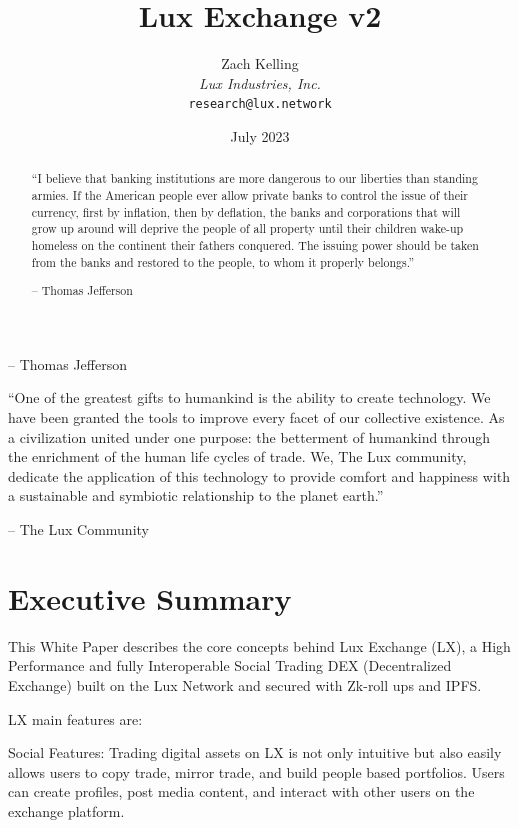 \documentclass[11pt]{article}
\title{Lux Exchange v2}
\author{Zach Kelling\\\textit{Lux Industries, Inc.}\\\texttt{research@lux.network}}
\date{July 2023}
\begin{document}
\luxcoverpage

\begin{abstract}
``I believe that banking institutions are more dangerous to our liberties than standing armies. If the American people ever allow private banks to control the issue of their currency, first by inflation, then by deflation, the banks and corporations that will grow up around will deprive the people of all property until their children wake-up homeless on the continent their fathers conquered. The issuing power should be taken from the banks and restored to the people, to whom it properly belongs.''

-- Thomas Jefferson
\end{abstract}

\tableofcontents
\newpage


-- Thomas Jefferson


``One of the greatest gifts to humankind is the ability to create technology. We have been granted the tools to improve every facet of our collective existence. As a civilization united under one purpose: the betterment of humankind through the enrichment of the human life cycles of trade. We, The Lux community, dedicate the application of this technology to provide comfort and happiness with a sustainable and symbiotic relationship to the planet earth.''


-- The Lux Community


\section{Executive Summary}

This White Paper describes the core concepts behind Lux Exchange (LX), a High Performance and fully  Interoperable Social Trading DEX (Decentralized Exchange) built on the Lux Network and secured with Zk-roll ups and IPFS.


LX main features are:


Social Features: Trading digital assets on LX is not only intuitive but also easily allows users to copy trade, mirror trade, and build people based portfolios. Users can create profiles, post media content, and interact with other users on the exchange platform.
\end{document}
